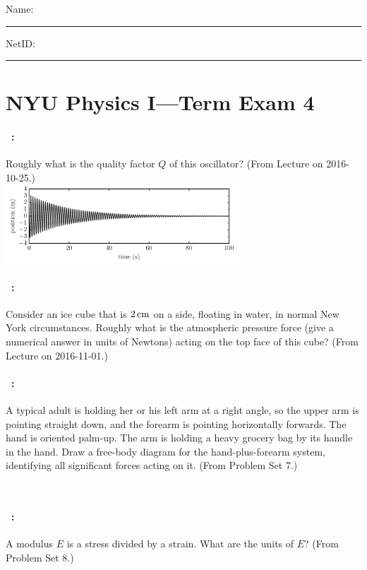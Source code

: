 \documentclass[12pt]{article} 
\begin{document}
\noindent
Name: \rule[-1ex]{0.55\textwidth}{0.1pt}
NetID: \rule[-1ex]{0.2\textwidth}{0.1pt}

\section*{NYU Physics I---Term Exam 4}

\paragraph{\problemname~\theproblem:}%
Roughly what is the quality factor $Q$ of this oscillator? (From
Lecture on 2016-10-25.) \\
\includegraphics[width=0.66\textwidth]{../py/damped_oscillation.pdf}

\vfill

\paragraph{\problemname~\theproblem:}%
Consider an ice cube that is $2\,\mathrm{cm}$ on a side, floating in water, in
normal New York circumstances. Roughly what is the atmospheric
pressure force (give a numerical answer in units of Newtons) acting on
the top face of this cube?  (From Lecture on 2016-11-01.)

\vfill

\paragraph{\problemname~\theproblem:}%
A typical adult is holding her or his left arm at a right angle, so
the upper arm is pointing straight down, and the forearm is pointing
horizontally forwards.  The hand is oriented palm-up.  The arm is
holding a heavy grocery bag by its handle in the hand.  Draw a
free-body diagram for the hand-plus-forearm system, identifying all
significant forces acting on it. (From Problem Set 7.)

\vfill
~
\clearpage

\paragraph{\problemname~\theproblem:}%
A modulus $E$ is a stress divided by a strain. What are the units of $E$?
(From Problem Set 8.)
\end{document}
